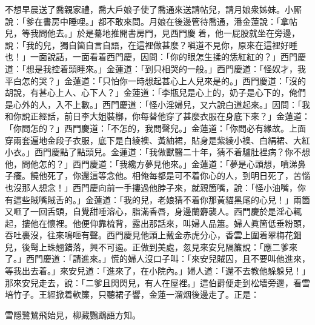 不想早晨送了喬親家禮，喬大戶娘子使了喬通來送請帖兒，請月娘衆姊妹。小厮說：「爹在書房中睡哩。」都不敢來問。月娘在後邊管待喬通，潘金蓮說：「拿帖兒，等我問他去。」於是驀地推開書房門，見西門慶𢱉着，他一屁股就坐在旁邊，說：「我的兒，獨自箇自言自語，在這裡做甚麼？嗔道不見你，原來在這裡好睡也！」一面說話，一面看着西門慶，因問：「你的眼怎生揉的恁紅紅的？」{}西門慶道：「想是我控着頭睡來。」金蓮道：「到只相哭的一般。」{}西門慶道：「怪奴才，我平白怎的哭？」金蓮道：「只怕你一時想起甚心上人兒來是的。」{}西門慶道：「沒的胡說，有甚心上人、心下人？」金蓮道：「李瓶兒是心上的，奶子是心下的，俺們是心外的人，入不上數。」西門慶道：「怪小淫婦兒，又六說白道起來。」因問：「我和你說正經話，前日李大姐裝槨，你每替他穿了甚麼衣服在身底下來？」金蓮道：「你問怎的？」西門慶道：「不怎的，我問聲兒。」金蓮道：「你問必有緣故。上面穿兩套遍地金段子衣服，底下是白綾襖、黃紬裙，貼身是紫綾小襖、白絹裙、大紅小衣。」西門慶點了點頭兒。金蓮道：「我做獸醫二十年，猜不着驢肚裡病？你不想他，問他怎的？」西門慶道：「我纔方夢見他來。」{}金蓮道：「夢是心頭想，噴涕鼻子癢。{}饒他死了，你還這等念他。相俺每都是可不着你心的人，到明日死了，苦惱也沒那人想念！」西門慶向前一手摟過他脖子來，就親箇嘴，說：「怪小油嘴，你有這些賊嘴賊舌的。」金蓮道：「我的兒，老娘猜不着你那黃貓黑尾的心兒！」兩箇又咂了一回舌頭，自覺甜唾溶心，脂滿香唇，身邊蘭麝襲人。西門慶於是淫心輒起，摟他在懷裡。他便仰靠梳背，露出那話來，叫婦人品簫。婦人眞箇低垂粉頭，吞吐裹沒，往來鳴咂有聲。西門慶見他頭上戴金赤虎分心，香雲上圍着翠梅花鈿兒，後髩上珠翹錯落，興不可遏。{}正做到美處，忽見來安兒隔簾說：「應二爹來了。」西門慶道：「請進來。」慌的婦人沒口子叫：「來安兒賊囚，且不要叫他進來，等我出去着。」來安兒道：「進來了，在小院內。」婦人道：「還不去教他躲躲兒！」那來安兒走去，說：「二爹且閃閃兒，有人在屋裡。」這伯爵便走到松墻旁邊，看雪培竹子。王經掀着軟簾，只聽裙子響，金蓮一溜烟後邊走了。正是：

\begin{myquote} 
雪隱鷺鷥飛始見，柳藏鸚鵡語方知。
\end{myquote} 

